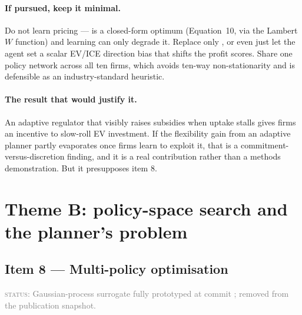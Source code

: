 \documentclass[11pt]{article}
\newcommand{\status}[1]{\textcolor{gray}{\textsc{status:} #1}}
\begin{document}
\paragraph{If pursued, keep it minimal.} Do not learn pricing --- 
 is a closed-form optimum (Equation~10,
via the Lambert $W$ function) and learning can only degrade it. Replace
only , or even just let the agent set a
scalar EV/ICE direction bias that shifts the profit scores. Share one
policy network across all ten firms, which avoids ten-way non-stationarity
and is defensible as an industry-standard heuristic.

\paragraph{The result that would justify it.} An adaptive regulator that
visibly raises subsidies when uptake stalls gives firms an incentive to
slow-roll EV investment. If the flexibility gain from an adaptive planner
partly evaporates once firms learn to exploit it, that is a
commitment-versus-discretion finding, and it is a real contribution rather
than a methods demonstration. But it presupposes item 8.

\section{Theme B: policy-space search and the planner's problem}

\subsection{Item 8 --- Multi-policy optimisation}
\label{sec:item8}

\status{Gaussian-process surrogate fully prototyped at commit
\code{c92bff8}; removed from the publication snapshot.}
\end{document}
